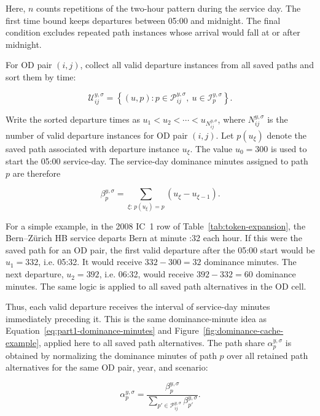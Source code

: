 \documentclass[preprint,12pt]{elsarticle}
\begin{document}
Here, \(n\) counts repetitions of the two-hour pattern during the service day. The first time bound keeps departures between 05:00 and midnight. The final condition excludes repeated path instances whose arrival would fall at or after midnight.

For OD pair \((i,j)\), collect all valid departure instances from all saved paths and sort them by time:

\begin{equation}
\mathcal{U}_{ij}^{y,\sigma}
=
\left\{
(u,p):p\in\mathcal{P}_{ij}^{y,\sigma},\ u\in\mathcal{I}_p^{y,\sigma}
\right\}.
\label{eq:part2-valid-departure-instances}
\end{equation}

Write the sorted departure times as
\(u_1<u_2<\cdots<u_{N_{ij}^{y,\sigma}}\), where \(N_{ij}^{y,\sigma}\) is the number of valid departure instances for OD pair \((i,j)\). Let \(p(u_\xi)\) denote the saved path associated with departure instance \(u_\xi\). The value \(u_0=300\) is used to start the 05:00 service-day. The service-day dominance minutes assigned to path \(p\) are therefore

\begin{equation}
\beta_p^{y,\sigma}
=
\sum_{\xi:\,p(u_\xi)=p}
\left(u_\xi-u_{\xi-1}\right).
\label{eq:part2-dominance-minutes}
\end{equation}

For a simple example, in the 2008 IC~1 row of Table~\ref{tab:token-expansion}, the Bern--Zürich HB service departs Bern at minute :32 each hour. If this were the saved path for an OD pair, the first valid departure after the 05:00 start would be \(u_1=332\), i.e. 05:32. It would receive \(332-300=32\) dominance minutes. The next departure, \(u_2=392\), i.e. 06:32, would receive \(392-332=60\) dominance minutes. The same logic is applied to all saved path alternatives in the OD cell.

Thus, each valid departure receives the interval of service-day minutes immediately preceding it. This is the same dominance-minute idea as Equation~\eqref{eq:part1-dominance-minutes} and Figure~\ref{fig:dominance-cache-example}, applied here to all saved path alternatives. The path share \(\alpha_p^{y,\sigma}\) is obtained by normalizing the dominance minutes of path \(p\) over all retained path alternatives for the same OD pair, year, and scenario:

\begin{equation}
\alpha_p^{y,\sigma}
=
\frac{\beta_p^{y,\sigma}}
{\sum_{p'\in\mathcal{P}_{ij}^{y,\sigma}}\beta_{p'}^{y,\sigma}}.
\label{eq:part2-path-share}
\end{equation}
\end{document}
